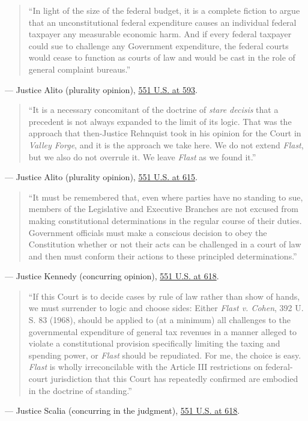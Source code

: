 \documentclass[12pt]{article}
\begin{document}
\begin{quote}
``In light of the size of the federal budget, it is a complete fiction to argue that an unconstitutional federal expenditure causes an individual federal taxpayer any measurable economic harm. And if every federal taxpayer could sue to challenge any Government expenditure, the federal courts would cease to function as courts of law and would be cast in the role of general complaint bureaus.''
\end{quote}
\noindent --- Justice Alito (plurality opinion), \href{https://supreme.justia.com/cases/federal/us/551/587/}{551 U.S. at 593}.

\begin{quote}
``It is a necessary concomitant of the doctrine of \textit{stare decisis} that a precedent is not always expanded to the limit of its logic. That was the approach that then-Justice Rehnquist took in his opinion for the Court in \textit{Valley Forge}, and it is the approach we take here. We do not extend \textit{Flast}, but we also do not overrule it. We leave \textit{Flast} as we found it.''
\end{quote}
\noindent --- Justice Alito (plurality opinion), \href{https://supreme.justia.com/cases/federal/us/551/587/}{551 U.S. at 615}.

\begin{quote}
``It must be remembered that, even where parties have no standing to sue, members of the Legislative and Executive Branches are not excused from making constitutional determinations in the regular course of their duties. Government officials must make a conscious decision to obey the Constitution whether or not their acts can be challenged in a court of law and then must conform their actions to these principled determinations.''
\end{quote}
\noindent --- Justice Kennedy (concurring opinion), \href{https://supreme.justia.com/cases/federal/us/551/587/}{551 U.S. at 618}.

\begin{quote}
``If this Court is to decide cases by rule of law rather than show of hands, we must surrender to logic and choose sides: Either \textit{Flast v. Cohen}, 392 U. S. 83 (1968), should be applied to (at a minimum) all challenges to the governmental expenditure of general tax revenues in a manner alleged to violate a constitutional provision specifically limiting the taxing and spending power, or \textit{Flast} should be repudiated. For me, the choice is easy. \textit{Flast} is wholly irreconcilable with the Article III restrictions on federal-court jurisdiction that this Court has repeatedly confirmed are embodied in the doctrine of standing.''
\end{quote}
\noindent --- Justice Scalia (concurring in the judgment), \href{https://supreme.justia.com/cases/federal/us/551/587/}{551 U.S. at 618}.
\end{document}
